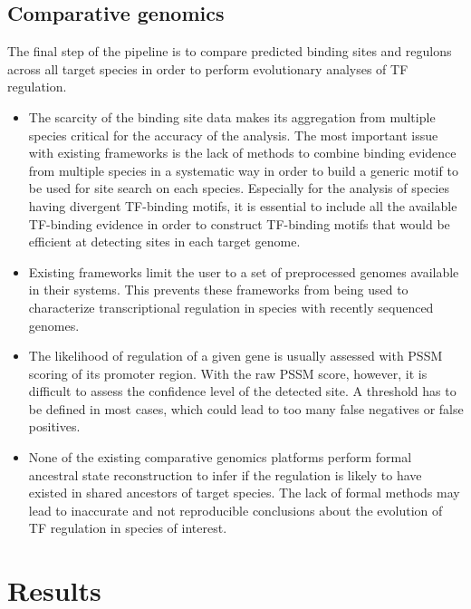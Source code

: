 \subsection{Comparative genomics}

The final step of the pipeline is to compare predicted binding sites and
regulons across all target species in order to perform evolutionary analyses of
TF regulation.

\begin{itemize}
\item The scarcity of the binding site data makes its aggregation from multiple
  species critical for the accuracy of the analysis. The most important issue
  with existing frameworks is the lack of methods to combine binding evidence
  from multiple species in a systematic way in order to build a generic motif
  to be used for site search on each species. Especially for the analysis of
  species having divergent TF-binding motifs, it is essential to include all
  the available TF-binding evidence in order to construct TF-binding motifs
  that would be efficient at detecting sites in each target genome.

\item Existing frameworks limit the user to a set of preprocessed genomes
  available in their systems. This prevents these frameworks from being used to
  characterize transcriptional regulation in species with recently sequenced
  genomes.

\item The likelihood of regulation of a given gene is usually assessed with PSSM
  scoring of its promoter region. With the raw PSSM score, however, it is difficult to
  assess the confidence level of the detected site. A threshold has to be
  defined in most cases, which could lead to too many false negatives or false
  positives.

\item None of the existing comparative genomics platforms perform formal
  ancestral state reconstruction to infer if the regulation is likely to have
  existed in shared ancestors of target species. The lack of formal methods may
  lead to inaccurate and not reproducible conclusions about the evolution of TF
  regulation in species of interest.
\end{itemize}

\section{Results}

